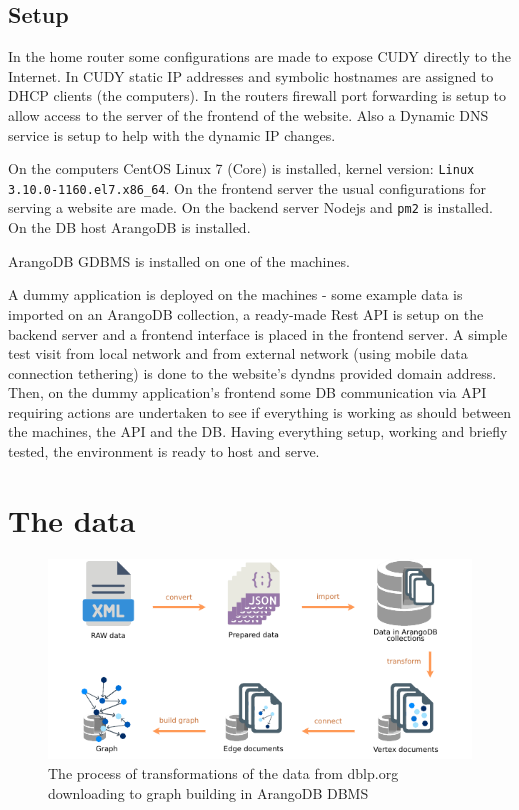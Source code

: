 \subsection{Setup} \label{subsection:ImplementingtheWebApp/Thehardware/Setup}
In the home router some configurations are made to expose CUDY directly to the Internet.
In CUDY static IP addresses and symbolic hostnames are assigned to DHCP clients (the computers).
In the routers firewall port forwarding is setup to allow access to the server of the frontend of the website.
Also a Dynamic DNS service is setup to help with the dynamic IP changes.

On the computers \gls{CentOS} Linux 7 (Core) is installed, kernel version: \texttt{Linux 3.10.0-1160.el7.x86\_64}.
On the \gls{frontend server} the usual configurations for serving a website are made.
On the \gls{backend server} Nodejs and \texttt{pm2} is installed.
On the DB host ArangoDB is installed.

ArangoDB GDBMS is installed on one of the machines.

A dummy application is deployed on the machines - some example data is imported on an ArangoDB collection, a ready-made Rest \acrshort{API} is setup on the \gls{backend server} and a frontend interface is placed in the \gls{frontend server}. A simple test visit from local network and from external network (using mobile data connection tethering) is done to the website's dyndns provided domain address. Then, on the dummy application's frontend some DB communication via \acrshort{API} requiring actions are undertaken to see if everything is working as should between the machines, the \acrshort{API} and the DB.
Having everything setup, working and briefly tested, the environment is ready to host and serve.

\section{The data} \label{section:ImplementingtheWebApp/Thedata}
\begin{figure}[H]%
	\centering%
	\includegraphics[width=1\textwidth,%
	]{images/chapter4/datatransformations.pdf}%
	\caption[The process of transformations of the data from dblp downloading to graph building in ArangoDB DBMS]{The process of transformations of the data from \gls{dblp.org} downloading to graph building in ArangoDB DBMS}%
	\label{fig:datatransformations}%
\end{figure}%

